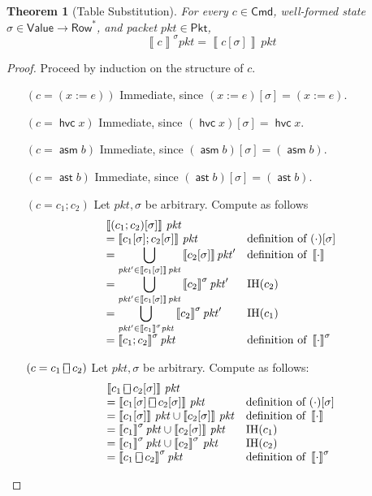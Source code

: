 \documentclass{article}
\newcommand{\pkt}{\mathit{pkt}}
\newcommand{\denote}[1]{\left\llbracket#1\right\rrbracket}
\newcommand{\Value}{\mathsf{Value}}
\newcommand{\Cmd}{\mathsf{Cmd}}
\newcommand{\Pkt}{\mathsf{Pkt}}
\newcommand{\Row}{\mathsf{Row}}
\newcommand{\assert}{\mathop{\mathsf{ast}}}
\newcommand{\assume}{\mathop{\mathsf{asm}}}
\newcommand{\choiceop}{\rotatebox[origin=c]{90}{$\sqsubset\!\!\!\sqsupset$}}
\newcommand{\choice}{\mathbin{\choiceop}}
\newcommand{\havoc}[1]{\mathop{\mathsf{hvc}}#1}
\theoremstyle{plain}
\newtheorem{theorem}{Theorem}
\theoremstyle{definition}
\theoremstyle{remark}
\begin{document}
\begin{theorem}[Table Substitution]
  \label{thm:subst}
  For every $c \in \Cmd$, well-formed state $\sigma \in \Value \to \Row^*$, and
  packet $\pkt \in \Pkt$,
  \[\denote{c}^\sigma\pkt = \denote{c[\sigma]}\,\pkt\]
\end{theorem}
\begin{proof}
   Proceed by induction on the structure of $c$.
  \begin{enumerate}[align=left]
    \item[$(c = (x := e))$] Immediate, since $(x:=e)[\sigma] = (x:=e)$.

    \item[$(c = \havoc x)$] Immediate, since $(\havoc x)[\sigma] = \havoc x$.

    \item[$(c = \assume b)$] Immediate, since $(\assume b)[\sigma] = (\assume b)$.

    \item[$(c = \assert b)$] Immediate, since $(\assert b)[\sigma] = (\assert b)$.


    \item[$(c = c_1;c_2)$] Let $\pkt,\sigma$ be arbitrary. Compute as follows
      \[\begin{array}{ >{\displaystyle}l l}
        \denote{(c_1;c_2)[\sigma]}\,\pkt \\
        = \denote{c_1[\sigma];c_2[\sigma]}\,\pkt  & \text{definition of } (\cdot)[\sigma]\\
        = \bigcup_{\pkt' \in \denote{c_1[\sigma]}\,\pkt} \denote{c_2[\sigma]}\pkt' & \text{definition of } \denote{\cdot}\\
        = \bigcup_{\pkt' \in \denote{c_1[\sigma]}\,\pkt} \denote{c_2}^\sigma\pkt' & \text{IH}(c_2) \\
        = \bigcup_{\pkt' \in \denote{c_1}^\sigma\pkt} \denote{c_2}^\sigma\pkt' & \text{IH}(c_1) \\
        = \denote{c_1;c_2}^\sigma\pkt & \text{definition of } \denote{\cdot}^\sigma
      \end{array}\]

    \item[$(c = c_1 \choice c_2)$] Let $\pkt, \sigma$ be arbitrary. Compute as follows:
      \[ \begin{array}{>{\displaystyle}ll}
          \denote{c_1\choice c_2[\sigma]}\,\pkt\\
          = \denote{c_1[\sigma] \choice c_2[\sigma]}\,\pkt & \text{definition of } (\cdot)[\sigma]\\
          = \denote{c_1[\sigma]}\,\pkt \cup \denote{c_2[\sigma]}\,\pkt & \text{definition of } \denote{\cdot}\\
          = \denote{c_1}^\sigma\pkt \cup \denote{c_2[\sigma]}\,\pkt & \text{IH}(c_1)\\
          = \denote{c_1}^\sigma\pkt \cup \denote{c_2}^\sigma\,\pkt & \text{IH}(c_2)\\
          = \denote{c_1\choice c_2}^\sigma\pkt & \text{definition of } \denote{\cdot}^\sigma
          \end{array}
      \]


\end{enumerate}
\end{proof}
\end{document}
